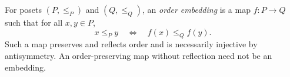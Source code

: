 
For posets $(P,\le_P)$ and $(Q,\le_Q)$, an \emph{order embedding} is a map $f:P\to Q$ such that for all $x,y\in P$,
\[
x\le_P y\quad\Longleftrightarrow\quad f(x)\le_Q f(y).
\]
Such a map preserves and reflects order and is necessarily injective by antisymmetry. An order-preserving map without reflection need not be an embedding.
